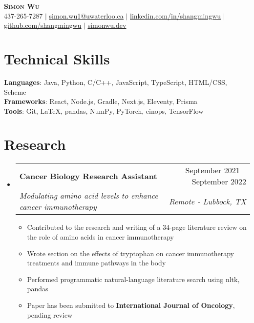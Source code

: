 \documentclass[letterpaper,11pt]{article}
\makeatletter
\newcommand{\resumeItem}[1]{
  \item\small{
    {#1 \vspace{-2pt}}
  }
}
\newcommand{\resumeSubheading}[4]{
  \vspace{-2pt}\item
    \begin{tabular*}{0.97\textwidth}[t]{l@{\extracolsep{\fill}}r}
      \textbf{#1} & #2 \\
      \textit{\small#3} & \textit{\small #4} \\
    \end{tabular*}\vspace{-7pt}
}
\newcommand{\resumeSubHeadingListStart}{\begin{itemize}[leftmargin=0.15in, label={}]}
\newcommand{\resumeSubHeadingListEnd}{\end{itemize}}
\newcommand{\resumeItemListStart}{\begin{itemize}}
\newcommand{\resumeItemListEnd}{\end{itemize}\vspace{-5pt}}
\makeatother
\begin{document}

\begin{center}
    \textbf{\Huge \scshape Simon Wu} \\ \vspace{1pt}
    \small 437-265-7287 $|$ \href{mailto:simon.wu1@uwaterloo.ca}{\underline{simon.wu1@uwaterloo.ca}} $|$ 
    \href{https://www.linkedin.com/in/simon-wu-53636a243}{\underline{linkedin.com/in/shangmingwu}} $|$
    \href{https://github.com/shangmingwu}{\underline{github.com/shangmingwu}} $|$
    \href{https://simonwu.dev}{\underline{simonwu.dev}}
\end{center}


\section{Technical Skills}
 \begin{itemize}[leftmargin=0.15in, label={}]
    \small{\item{
     \textbf{Languages}{: Java, Python, C/C++, JavaScript, TypeScript, HTML/CSS, Scheme } \\
     \textbf{Frameworks}{: React, Node.js, Gradle, Next.js, Eleventy, Prisma } \\
     \textbf{Tools}{: Git, \LaTeX, pandas, NumPy, PyTorch, einops, TensorFlow}
    }}
 \end{itemize}


\section{Research}
 \resumeSubHeadingListStart
  \resumeSubheading{Cancer Biology Research Assistant}{September 2021 -- September 2022}{Modulating amino acid levels to enhance cancer immunotherapy}{Remote - Lubbock, TX}
    \resumeItemListStart
        \resumeItem{Contributed to the research and writing of a 34-page literature review on the role of amino acids in cancer immunotherapy}
        \resumeItem{Wrote section on the effects of tryptophan on cancer immunotherapy treatments and immune pathways in the body}
        \resumeItem{Performed programmatic natural-language literature search using nltk, pandas}
        \resumeItem{Paper has been submitted to \textbf{International Journal of Oncology}, pending review}
    \resumeItemListEnd
 \resumeSubHeadingListEnd
\end{document}
